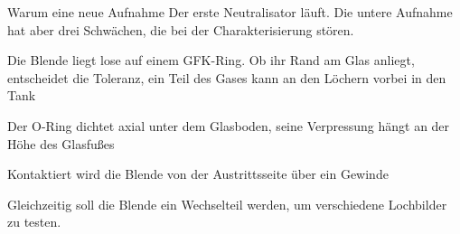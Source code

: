 \documentclass[10pt,aspectratio=169]{beamer}
\makeatletter
\let\jlu@olditemize\itemize
\let\jlu@oldenditemize\enditemize
\renewenvironment{itemize}
  {\jlu@olditemize\setlength{\itemsep}{1pt}\setlength{\parsep}{0pt}\setlength{\topsep}{2pt}}
  {\jlu@oldenditemize}
\makeatother
\begin{document}
\begin{frame}{Warum eine neue Aufnahme}
  \vfill
  Der erste Neutralisator läuft. Die untere Aufnahme hat aber drei Schwächen,
  die bei der Charakterisierung stören.

  \vspace{0.6em}
  \begin{itemize}
    \item Die Blende liegt lose auf einem GFK-Ring. Ob ihr Rand am Glas anliegt, entscheidet die Toleranz,
          ein Teil des Gases kann an den Löchern vorbei in den Tank
    \item Der O-Ring dichtet axial unter dem Glasboden, seine Verpressung hängt an der Höhe des Glasfußes
    \item Kontaktiert wird die Blende von der Austrittsseite über ein Gewinde
  \end{itemize}

  \vspace{0.6em}
  Gleichzeitig soll die Blende ein Wechselteil werden, um verschiedene Lochbilder zu testen.
  \vfill
\end{frame}
\end{document}
